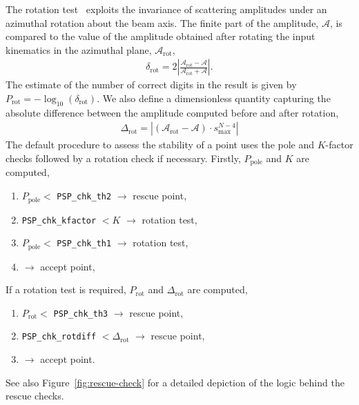 The rotation test~\cite{vanDeurzen:2013saa} exploits the invariance of scattering amplitudes under an azimuthal rotation about the beam axis.
The finite part of the amplitude, $\mathcal{A}$, is compared to the value of the amplitude obtained after rotating the input kinematics in the azimuthal plane, $\mathcal{A}_\mathrm{rot}$,
\begin{align}
\delta_\mathrm{rot} = 2 \left| \frac{\mathcal{A}_\mathrm{rot}-\mathcal{A}}{\mathcal{A}_\mathrm{rot}+\mathcal{A}} \right|.
\end{align}
The estimate of the number of correct digits in the result is given by $P_\mathrm{rot} = - \log_{10} ( \delta_\mathrm{rot})$.
We also define a dimensionless quantity capturing the absolute difference between the amplitude computed before and after rotation,
\begin{align}
\Delta_\mathrm{rot} = | (\mathcal{A}_\mathrm{rot}-\mathcal{A}) \cdot s_{\max}^{N-4} |
\end{align}
%
The default procedure to assess the stability of a point uses the pole and $K$-factor checks followed by a rotation check if necessary.
Firstly, $P_\mathrm{pole}$ and $K$ are computed,
\begin{enumerate}
\item $P_\mathrm{pole} <$ \texttt{PSP\_chk\_th2} $\rightarrow$ rescue point,
\item \texttt{PSP\_chk\_kfactor} $ < K$  $\rightarrow$ rotation test,
\item $P_\mathrm{pole} < $ \texttt{PSP\_chk\_th1} $\rightarrow$ rotation test,
\item $\rightarrow$ accept point,
\end{enumerate}
If a rotation test is required, $P_\mathrm{rot}$ and $\Delta_\mathrm{rot}$ are computed,
\begin{enumerate}
\item $P_\mathrm{rot} <$ \texttt{PSP\_chk\_th3} $\rightarrow$ rescue point,
\item \texttt{PSP\_chk\_rotdiff} $< \Delta_\mathrm{rot}$ $\rightarrow$ rescue point,
\item $\rightarrow$ accept point.
\end{enumerate}
See also Figure~\ref{fig:rescue-check} for a detailed depiction of the logic behind the rescue checks.\\

